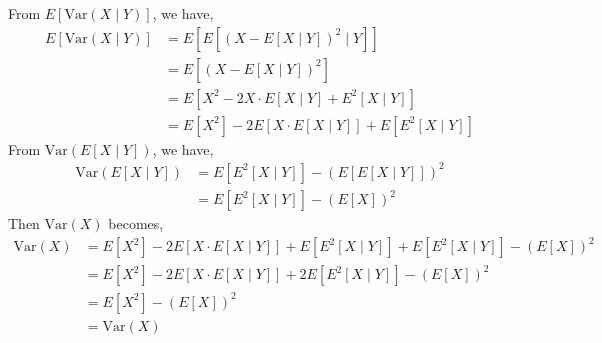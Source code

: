 \documentclass{article}
\begin{document}
\begin{enumerate}
				From $E[\mathrm{Var}(X \mid Y)]$, we have,
				\begin{align*}
					E[\mathrm{Var}(X \mid Y)] &= E[E[(X - E[X \mid Y])^2 \mid Y]] \\
					&= E[(X - E[X \mid Y])^2] \\
					&= E[X^2 -2X \cdot E[X \mid Y] + E^2[X \mid Y]] \\
					&= E[X^2] - 2E[X \cdot E[X \mid Y]] + E[E^2[X \mid Y]]
				\end{align*}
				From $\mathrm{Var}(E[X \mid Y])$, we have,
				\begin{align*}
					\mathrm{Var}(E[X \mid Y]) &= E[E^2[X \mid Y]] - (E[E[X \mid Y]])^2 \\
					&= E[E^2[X \mid Y]] - (E[X])^2
				\end{align*}
				Then $\mathrm{Var}(X)$ becomes,
				\begin{align*}
					\mathrm{Var}(X) &= E[X^2] - 2E[X \cdot E[X \mid Y]] + E[E^2[X \mid Y]] + E[E^2[X \mid Y]] - (E[X])^2 \\
					&= E[X^2] - 2E[X \cdot E[X \mid Y]] + 2E[E^2[X \mid Y]] - (E[X])^2 \\
					&= E[X^2] - (E[X])^2 \\
					&= \mathrm{Var}(X)
				\end{align*}
		\end{enumerate}
\end{document}
